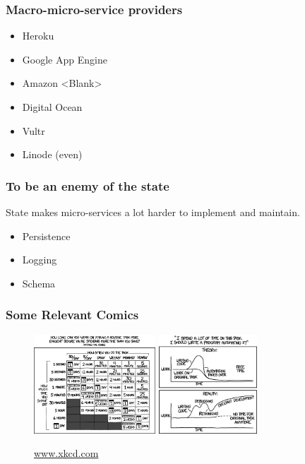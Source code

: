 \documentclass{beamer}
\begin{document}
\begin{frame}[fragile]
  
  \frametitle{Macro-micro-service providers}

  \begin{itemize}
  \item{Heroku}
  \item{Google App Engine}
  \item{Amazon <Blank>}
  \item{Digital Ocean} 
  \item{Vultr} 
  \item{Linode (even)} 
  \end{itemize}

\end{frame}

\begin{frame}[fragile]
  \frametitle{To be an enemy of the state}

  State makes micro-services a lot harder to implement and maintain.
  
  \begin{itemize}
  \item{Persistence}
  \item{Logging}
  \item{Schema}
  \end{itemize}
  
\end{frame}

\begin{frame}[fragile]
  \frametitle{Some Relevant Comics}

   \begin{figure}[p]
    \centering
    \includegraphics[height=10em]{is_it_worth_the_time.png}
    \includegraphics[height=10em]{automation.png}
    \caption{\url{www.xkcd.com}}
  \end{figure}

\end{frame}
\end{document}
